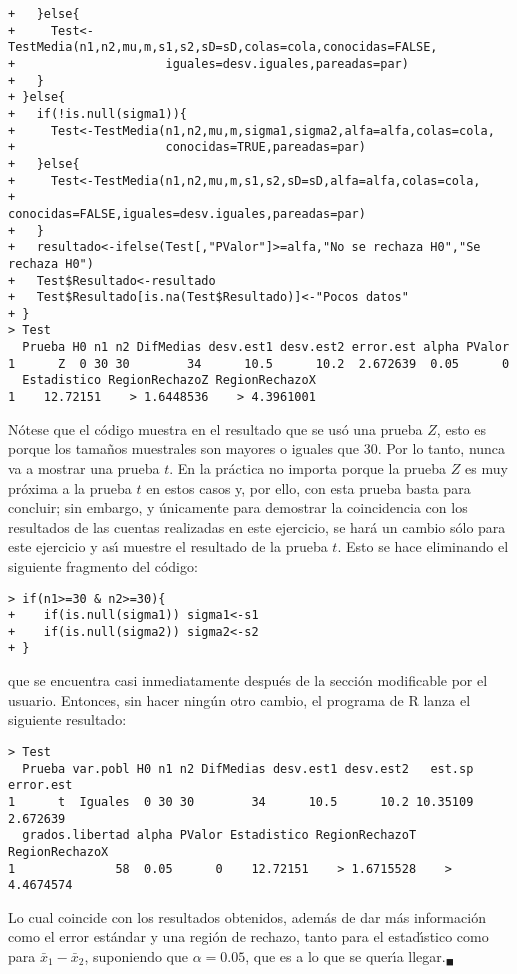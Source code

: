 \begin{solucion}
\begin{verbatim}
+   }else{
+     Test<-TestMedia(n1,n2,mu,m,s1,s2,sD=sD,colas=cola,conocidas=FALSE,
+                     iguales=desv.iguales,pareadas=par)
+   }
+ }else{
+   if(!is.null(sigma1)){
+     Test<-TestMedia(n1,n2,mu,m,sigma1,sigma2,alfa=alfa,colas=cola,
+                     conocidas=TRUE,pareadas=par)
+   }else{
+     Test<-TestMedia(n1,n2,mu,m,s1,s2,sD=sD,alfa=alfa,colas=cola,
+                     conocidas=FALSE,iguales=desv.iguales,pareadas=par)
+   }
+   resultado<-ifelse(Test[,"PValor"]>=alfa,"No se rechaza H0","Se rechaza H0")
+   Test$Resultado<-resultado
+   Test$Resultado[is.na(Test$Resultado)]<-"Pocos datos"
+ }
> Test
  Prueba H0 n1 n2 DifMedias desv.est1 desv.est2 error.est alpha PValor
1      Z  0 30 30        34      10.5      10.2  2.672639  0.05      0
  Estadistico RegionRechazoZ RegionRechazoX
1    12.72151    > 1.6448536    > 4.3961001
 \end{verbatim}
 \vspace{-0.5cm}
 N\'otese que el c\'odigo muestra en el resultado
 que se us\'o una prueba $Z$,
 esto es porque los tama\~nos muestrales son mayores
 o iguales que $30$.
 Por lo tanto, nunca va a mostrar una prueba $t$.
 En la pr\'actica no importa
 porque la prueba $Z$ es muy pr\'oxima a la prueba $t$
 en estos casos y, por ello, con esta prueba basta para concluir;
 sin embargo, y \'unicamente para demostrar la coincidencia
 con los resultados de las cuentas realizadas en este ejercicio,
 se har\'a un cambio s\'olo para este ejercicio
 y as\'{\i} muestre el resultado de la prueba $t$.
 Esto se hace eliminando el siguiente fragmento del c\'odigo:
 \begin{verbatim}
> if(n1>=30 & n2>=30){
+    if(is.null(sigma1)) sigma1<-s1
+    if(is.null(sigma2)) sigma2<-s2
+ }
 \end{verbatim}
 \vspace{-0.5cm}
 que se encuentra casi inmediatamente despu\'es
 de la secci\'on modificable por el usuario.
 Entonces, sin hacer ning\'un otro cambio, el programa de R lanza
 el siguiente resultado:
 \begin{verbatim}
> Test
  Prueba var.pobl H0 n1 n2 DifMedias desv.est1 desv.est2   est.sp error.est
1      t  Iguales  0 30 30        34      10.5      10.2 10.35109  2.672639
  grados.libertad alpha PValor Estadistico RegionRechazoT RegionRechazoX
1              58  0.05      0    12.72151    > 1.6715528    > 4.4674574
 \end{verbatim}
 \vspace{-0.5cm}
 Lo cual coincide con los resultados obtenidos,
 adem\'as de dar m\'as informaci\'on como el error est\'andar
 y una regi\'on de rechazo, tanto para el estad\'{\i}stico 
 como para $\bar{x}_1-\bar{x}_2$, suponiendo que $\alpha=0.05$,
 que es a lo que se quer\'{\i}a llegar.${}_{\blacksquare}$
\end{solucion}
